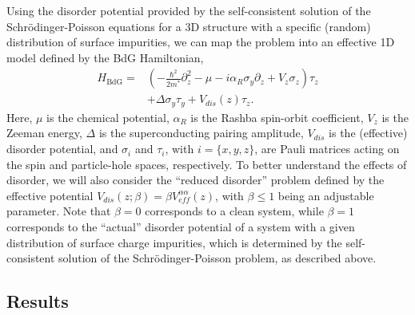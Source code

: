 \documentclass[aps,prmaterials,twocolumn,superscriptaddress,longbibliography]{revtex4-2}
\begin{document}
Using the disorder potential provided by the self-consistent solution of the Schr{\"o}dinger-Poisson equations for a 3D structure with a specific (random) distribution of surface impurities, 
we can map the problem into an effective 1D model  \cite{lutchyn2010majorana,oreg2010helical} defined by the BdG Hamiltonian,
\begin{equation}
    \begin{split}
    H_{\text{BdG}} =& \left(-\frac{\hbar^2}{2m^*} \partial_z^2 - \mu - i\alpha_R\sigma_y\partial_z + V_z\sigma_z 
    \right) \tau_z \\
    &+ \Delta \sigma_y \tau_y 
    + V_{dis}(z) \tau_z.
    \end{split} \label{HamBdG}
\end{equation}
Here, $\mu$ is the chemical potential, $\alpha_R$ is the Rashba spin-orbit coefficient, $V_z$ is the Zeeman energy, $\Delta$ is the superconducting pairing amplitude, $V_{dis}$ is the (effective) disorder potential, and $\sigma_i$ and $\tau_i$, with $i = \{x,y,z\}$, are Pauli matrices acting on the spin and particle-hole spaces, respectively. To better understand the  effects of disorder, we will also consider the ``reduced disorder'' problem defined by the effective  potential  $V_{dis}(z; \beta) = \beta V_{eff}^{\alpha \alpha}(z)$, with $\beta\leq 1$ being an adjustable parameter. Note that $\beta=0$ corresponds to a clean system, while $\beta=1$ corresponds to the ``actual'' disorder potential of a system with a given distribution of surface charge impurities, which is determined by the self-consistent solution of the Schr{\"o}dinger-Poisson problem, as described above.


\subsection{Results} \label{SCD_Results} %
\end{document}
